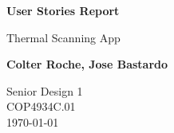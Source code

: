 \begin{titlepage}
    \begin{center}
        \vspace*{1cm}
            
        \Huge
        \textbf{User Stories Report}
            
        \vspace{0.5cm}
        \LARGE
        Thermal Scanning App
            
        \vspace{1.5cm}
            
        \textbf{Colter Roche, Jose Bastardo}
            
        \vfill
          
        \Large
        Senior Design 1\\
        COP4934C.01\\
        \today
            
    \end{center}
\end{titlepage}